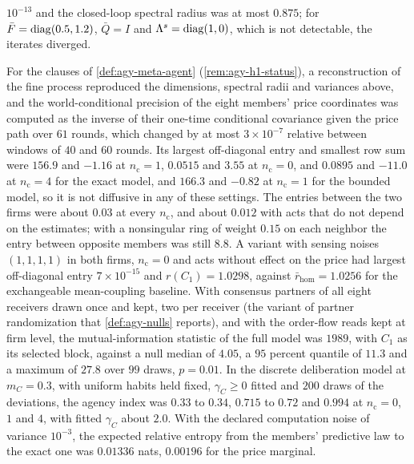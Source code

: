 \begin{numcheck}
$10^{-13}$ and the closed-loop spectral radius was at most $0.875$; for $\bar F=\operatorname{diag}(0.5,1.2)$, $\bar Q=I$ and $\Lambda^s=\operatorname{diag}(1,0)$, which is not detectable, the iterates diverged.

For the clauses of \cref{def:agy-meta-agent} (\cref{rem:agy-h1-status}), a reconstruction of the fine process reproduced the dimensions, spectral radii and variances above, and the world-conditional precision of the eight members' price coordinates was computed as the inverse of their one-time conditional covariance given the price path over $61$ rounds, which changed by at most $3\times10^{-7}$ relative between windows of $40$ and $60$ rounds. Its largest off-diagonal entry and smallest row sum were $156.9$ and $-1.16$ at $n_{\mathrm c}=1$, $0.0515$ and $3.55$ at $n_{\mathrm c}=0$, and $0.0895$ and $-11.0$ at $n_{\mathrm c}=4$ for the exact model, and $166.3$ and $-0.82$ at $n_{\mathrm c}=1$ for the bounded model, so it is not diffusive in any of these settings. The entries between the two firms were about $0.03$ at every $n_{\mathrm c}$, and about $0.012$ with acts that do not depend on the estimates; with a nonsingular ring of weight $0.15$ on each neighbor the entry between opposite members was still $8.8$. A variant with sensing noises $(1,1,1,1)$ in both firms, $n_{\mathrm c}=0$ and acts without effect on the price had largest off-diagonal entry $7\times10^{-15}$ and $r(C_1)=1.0298$, against $\bar r_{\mathrm{hom}}=1.0256$ for the exchangeable mean-coupling baseline. With consensus partners of all eight receivers drawn once and kept, two per receiver (the variant of partner randomization that \cref{def:agy-nulls} reports), and with the order-flow reads kept at firm level, the mutual-information statistic of the full model was $1989$, with $C_1$ as its selected block, against a null median of $4.05$, a $95$ percent quantile of $11.3$ and a maximum of $27.8$ over $99$ draws, $p=0.01$. In the discrete deliberation model at $m_C=0.3$, with uniform habits held fixed, $\gamma_C\ge0$ fitted and $200$ draws of the deviations, the agency index was $0.33$ to $0.34$, $0.715$ to $0.72$ and $0.994$ at $n_{\mathrm c}=0$, $1$ and $4$, with fitted $\gamma_C$ about $2.0$. With the declared computation noise of variance $10^{-3}$, the expected relative entropy from the members' predictive law to the exact one was $0.01336$ nats, $0.00196$ for the price marginal.
\end{numcheck}

